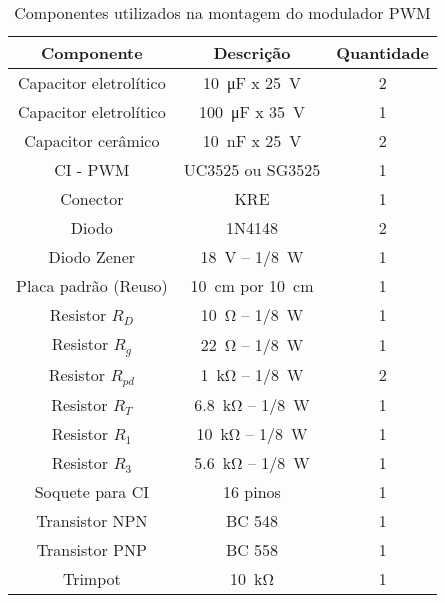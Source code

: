 \begin{table}[!ht]
	\centering
	\caption{Componentes utilizados na montagem do modulador PWM}
	\label{tab:componentesPWM}
	\begin{tabular}{@{}ccc@{}}
		\toprule
		\textbf{Componente} & \textbf{Descrição} & \textbf{Quantidade} \\ \midrule			
		Capacitor eletrolítico          & \SI{10}{\micro\farad} x \SI{25}{\V}      & 2  \\		
		Capacitor eletrolítico          & \SI{100}{\micro\farad} x \SI{35}{\V}      & 1  \\
		Capacitor cerâmico          & \SI{10}{\nano\farad} x \SI{25}{\V}      & 2  \\
			CI - PWM      & UC3525 ou SG3525            & 1                   \\
			Conector       & KRE   & 1    \\
				Diodo              & 1N4148             & 2                   \\
			Diodo   Zener          &  \SI{18}{\V} -- \SI{1/8}{\W}              & 1        \\
				Placa padrão (Reuso)        & \SI{10}{\cm} por \SI{10}{\cm}         & 1    \\
				Resistor  $R_D$     & \SI{10}{\ohm} -- \SI{1/8}{\W}    & 1    \\	
		 Resistor   $R_g$    & \SI{22}{\ohm} -- \SI{1/8}{\W}    & 1    \\
	    Resistor  $R_{pd}$     & \SI{1}{\kilo\ohm} -- \SI{1/8}{\W}    & 2     \\	     
	       Resistor  $R_T$     & \SI{6.8}{\kilo\ohm} -- \SI{1/8}{\W}    & 1    \\
	        Resistor  $R_1$     & \SI{10}{\kilo\ohm} -- \SI{1/8}{\W}    & 1    \\ 
	       Resistor  $R_3$     & \SI{5.6}{\kilo\ohm} -- \SI{1/8}{\W}    & 1    \\              
	          	Soquete para CI        & 16 pinos           & 1                   \\
	       	Transistor    NPN          & BC 548             & 1          \\
	       Transistor    PNP          & BC 558             & 1          \\
	          Trimpot       & \SI{10}{\kilo\ohm}    & 1    \\  \bottomrule	
	\end{tabular}
\end{table}



